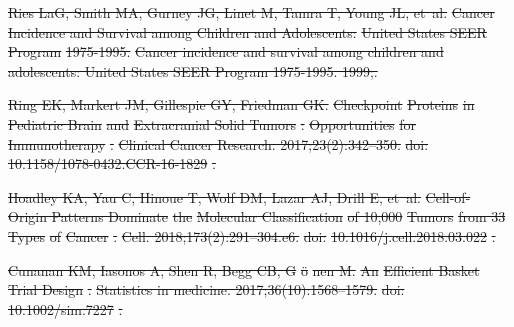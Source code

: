 \documentclass[10pt,letterpaper]{article}
\providecommand{\DIFdeltex}[1]{{\protect\color{red}\sout{#1}}}                      %
\providecommand{\DIFdel}[1]{\texorpdfstring{\DIFdeltex{#1}}{}} %
\begin{document}
\begin{thebibliography}{10}
\DIFdel{Ries LaG, Smith MA, Gurney JG, Linet M, Tamra T, Young JL, et~al.
	}%
\DIFdel{Cancer Incidence and Survival among Children and Adolescents:
	}%
\DIFdel{United States SEER Program}%
\DIFdel{1975-1995.
	}%
\DIFdel{Cancer incidence and survival among children and adolescents: United
	States SEER Program 1975-1995. 1999;.
	}%

\DIFdel{Ring EK, Markert JM, Gillespie GY, Friedman GK.
	}%
\DIFdel{Checkpoint }%
\DIFdel{Proteins}%
\DIFdel{in }%
\DIFdel{Pediatric Brain}%
\DIFdel{and }%
\DIFdel{Extracranial
			Solid Tumors}%
\DIFdel{: }%
\DIFdel{Opportunities}%
\DIFdel{for }%
\DIFdel{Immunotherapy}%
\DIFdel{.
	}%
\DIFdel{Clinical Cancer Research. 2017;23(2):342--350.
	}%
\DIFdel{doi:}%
\DIFdel{10.1158/1078-0432.CCR-16-1829}%
\DIFdel{.
	}%

\DIFdel{Hoadley KA, Yau C, Hinoue T, Wolf DM, Lazar AJ, Drill E, et~al.
	}%
\DIFdel{Cell-of-}%
\DIFdel{Origin Patterns Dominate}%
\DIFdel{the }%
\DIFdel{Molecular Classification}%
\DIFdel{of 10,000 }%
\DIFdel{Tumors}%
\DIFdel{from 33 }%
\DIFdel{Types}%
\DIFdel{of }%
\DIFdel{Cancer}%
\DIFdel{.
	}%
\DIFdel{Cell. 2018;173(2):291--304.e6.
	}%
\DIFdel{doi:}%
\DIFdel{10.1016/j.cell.2018.03.022}%
\DIFdel{.
	}%

\DIFdel{Cunanan KM, Iasonos A, Shen R, Begg CB, G}%
\DIFdel{\"o}%
\DIFdel{nen M.
	}%
\DIFdel{An }%
\DIFdel{Efficient Basket Trial Design}%
\DIFdel{.
	}%
\DIFdel{Statistics in medicine. 2017;36(10):1568--1579.
	}%
\DIFdel{doi:}%
\DIFdel{10.1002/sim.7227}%
\DIFdel{.
	}%


\end{thebibliography}
\end{document}
